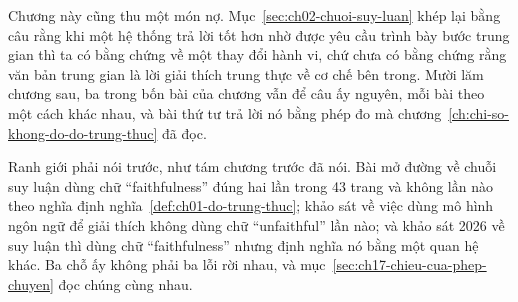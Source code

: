 %
Chương này cũng thu một món nợ. Mục~\ref{sec:ch02-chuoi-suy-luan} khép lại bằng
câu rằng khi một hệ thống trả lời tốt hơn nhờ được yêu cầu trình bày bước trung
gian thì ta có bằng chứng về một thay đổi hành vi, chứ chưa có bằng chứng rằng
văn bản trung gian là lời giải thích trung thực về cơ chế bên trong. Mười lăm
chương sau, ba trong bốn bài của chương vẫn để câu ấy nguyên, mỗi bài theo một
cách khác nhau, và bài thứ tư trả lời nó bằng phép đo mà
chương~\ref{ch:chi-so-khong-do-do-trung-thuc} đã đọc.

Ranh giới phải nói trước, như tám chương trước đã nói. Bài mở đường về chuỗi
suy luận dùng chữ \enquote{faithfulness} đúng hai lần trong 43 trang và không
lần nào theo nghĩa
định nghĩa~\ref{def:ch01-do-trung-thuc}; khảo sát về việc dùng mô hình ngôn ngữ
để giải thích không dùng chữ \enquote{unfaithful} lần nào; và khảo sát 2026 về
suy luận thì dùng chữ \enquote{faithfulness} nhưng định nghĩa nó bằng một quan
hệ khác. Ba chỗ ấy không phải ba lỗi rời nhau, và
mục~\ref{sec:ch17-chieu-cua-phep-chuyen} đọc chúng cùng nhau.









